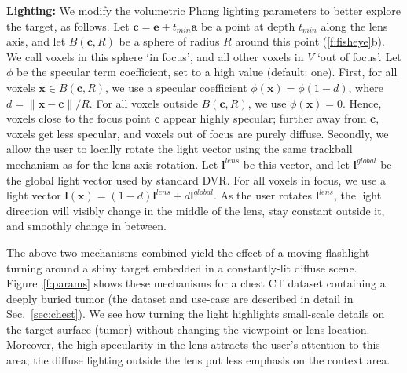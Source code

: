 \vspace{0.2cm}
\noindent\textbf{Lighting:} We modify the volumetric Phong lighting parameters to better explore the target, as follows. Let $\mathbf{c} = \mathbf{e} + t_{min}\mathbf{a}$ be a point at depth $t_{min}$ along the lens axis, and let $B(\mathbf{c},R)$ be a sphere of radius $R$ around this point (\autoref{f:fisheye}b). We call voxels in this sphere `in focus', and all other voxels in $V$ `out of focus'. Let $\phi$ be the specular term coefficient, set to a high value (default: one).
First, for all voxels $\mathbf{x} \in B(\mathbf{c},R)$, we use a specular coefficient $\phi(\mathbf{x}) = \phi (1-d)$, where $d=\|\mathbf{x}-\mathbf{c}\|/R$. For all voxels outside $B(\mathbf{c},R)$, we use $\phi(\mathbf{x}) = 0$. Hence, voxels close to the focus point $\mathbf{c}$ appear highly specular; further away from $\mathbf{c}$, voxels get less specular, and voxels out of focus are purely diffuse. Secondly, we allow the user to locally rotate the light vector using the same trackball mechanism as for the lens axis rotation. Let $\mathbf{l}^{lens}$ be this vector, and let $\mathbf{l}^{global}$ be the global light vector used by standard DVR. For all voxels in focus, we use a light vector $\mathbf{l}(\mathbf{x}) = (1 - d)\mathbf{l}^{lens} + d\mathbf{l}^{global}$. As the user rotates $\mathbf{l}^{lens}$, the light direction will visibly change in the middle of the lens, stay constant outside it, and smoothly change in between.

The above two mechanisms combined yield the effect of a moving flashlight turning around a shiny target embedded in a constantly-lit diffuse scene. Figure~\ref{f:params} shows these mechanisms for a chest CT dataset containing a deeply buried tumor (the dataset and use-case are described in detail in Sec.~\ref{sec:chest}). We see how turning the light highlights small-scale details on the target surface (tumor) without changing the viewpoint or lens location. Moreover, the high specularity in the lens attracts the user's attention to this area; the diffuse lighting outside the lens put less emphasis on the context area. 

